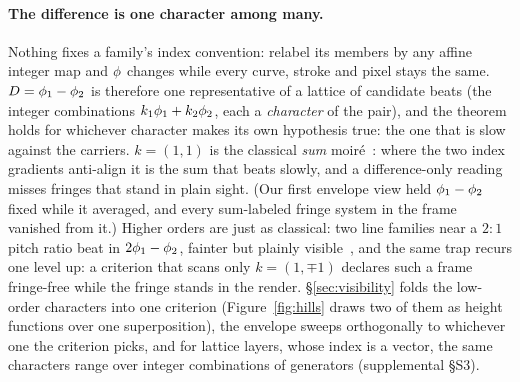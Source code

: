 \paragraph{The difference is one character among many.}
Nothing fixes a family's index convention: relabel its members by any affine
integer map and $\phi$ changes while every curve, stroke and pixel stays the
same. $D=\phi_1-\phi_2$ is therefore one representative of a lattice of
candidate beats (the integer combinations $k_1\phi_1+k_2\phi_2$, each a
\emph{character} of the pair), and the theorem holds for whichever character
makes its own hypothesis true: the one that is slow against the carriers.
$k=(1,1)$ is the classical \emph{sum} moir\'e~\cite{Oster1964}: where the two
index gradients anti-align it is the sum that beats slowly, and a
difference-only reading misses fringes that stand in plain sight. (Our first
envelope view held $\phi_1-\phi_2$ fixed while it averaged, and every
sum-labeled fringe system in the frame vanished from it.) Higher orders are
just as classical: two line families near a $2{:}1$ pitch ratio beat in
$2\phi_1-\phi_2$, fainter but plainly
visible~\cite{Amidror1994TConv, Amidror2009Theory}, and the same trap
recurs one level up: a criterion that scans only $k=(1,\mp1)$ declares such a
frame fringe-free while the fringe stands in the render.
\S\ref{sec:visibility} folds the low-order characters into one criterion
(Figure~\ref{fig:hills} draws two of them as height functions over one
superposition), the envelope sweeps orthogonally to whichever one the
criterion picks, and for lattice layers, whose index is a vector, the same
characters range over integer combinations of generators (supplemental \S S3).

